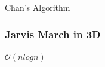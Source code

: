 \documentclass{beamer}
\begin{document}
    \begin{frame}{Chan's Algorithm}
      \end{frame}
      
      
      \begin{frame}
        \frametitle{Jarvis March in 3D}
        
        \begin{center}
          
          $\mathcal{O}(n log n)$
        \end{center}
      \end{frame}
      
      
        
          
          
 
    

\end{document}

